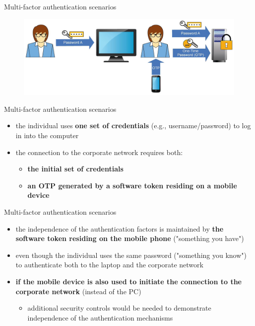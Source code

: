 \documentclass[pdf]{beamer}
\begin{document}
\begin{frame}{Multi-factor authentication scenarios}

\begin{figure}[t]
\centering
\includegraphics[scale=0.35]{Images/scenario3}
\end{figure}

\end{frame}



\begin{frame}{Multi-factor authentication scenarios}
\begin{itemize}
\item
the individual uses \textbf{one set of credentials} (e.g., username/password) to log in into the computer

\item
the connection to the corporate network requires both:
\begin{itemize}
\item
\textbf{the initial set of credentials}
\item
\textbf{an OTP generated by a software token residing on a mobile device}
\end{itemize}
\end{itemize}
\end{frame}



\begin{frame}{Multi-factor authentication scenarios}
\begin{itemize}
\item
the independence of the authentication factors is maintained by \textbf{the software token residing on the mobile phone} ("something you have")

\item
even though the individual uses the same password ("something you know") to authenticate both to the laptop and the corporate network

\item
\textbf{if the mobile device is also used to initiate the connection to the corporate network} (instead of the PC)

\begin{itemize}
\item
additional security controls would be needed to demonstrate independence of the authentication mechanisms
\end{itemize}
\end{itemize}
\end{frame}
\end{document}
